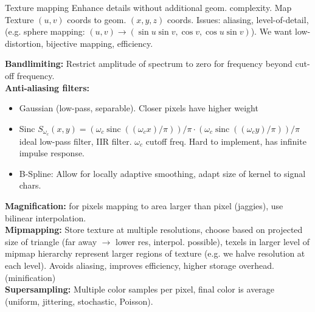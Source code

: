 \documentclass[a4paper,9pt]{article}
\begin{document}
\begin{subbox}{Texture mapping}
Enhance details without additional geom. complexity. Map Texture $(u, v)$ coords to geom. $(x, y, z)$ coords. Issues: aliasing, level-of-detail, (e.g. sphere mapping: $(u, v) \to (\sin u \sin v, \cos v, \cos u \sin v)$). We want low-distortion, bijective mapping, efficiency.
\end{subbox}
\textbf{Bandlimiting:} Restrict amplitude of spectrum to zero for frequency beyond cut-off frequency.\\
\textbf{Anti-aliasing filters:}
\begin{itemize}
  \item Gaussian (low-pass, separable). Closer pixels have higher weight
  \item Sinc $S_{\omega_c}(x, y) = (\omega_c \operatorname{sinc}((\omega_c x)/\pi))/\pi \cdot (\omega_c \operatorname{sinc}((\omega_c y)/\pi))/\pi$ ideal low-pass filter, IIR filter. $\omega_c$ cutoff freq. Hard to implement, has infinite impulse response.
  \item B-Spline: Allow for locally adaptive smoothing, adapt size of kernel to signal chars.
\end{itemize}
\textbf{Magnification:} for pixels mapping to area larger than pixel (jaggies), use bilinear interpolation.\\
\textbf{Mipmapping:} Store texture at multiple resolutions, choose based on projected size of triangle (far away $\to$ lower res, interpol. possible), texels in larger level of mipmap hierarchy represent larger regions of texture (e.g. we halve resolution at each level). Avoids aliasing, improves efficiency, higher storage overhead. (minification)\\
\textbf{Supersampling:} Multiple color samples per pixel, final color is average (uniform, jittering, stochastic, Poisson).\\
\end{document}

